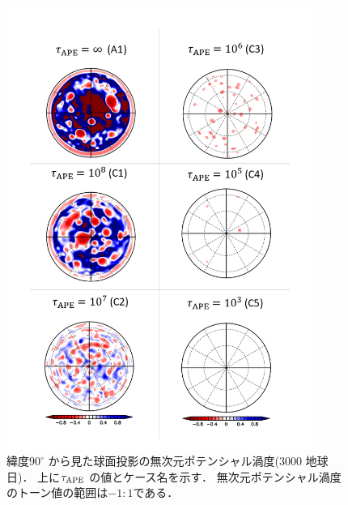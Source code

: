 \documentclass[a4j,12pt,openbib,oneside]{jreport}
\begin{document}
\begin{figure}[ht]
  \begin{center}
    \includegraphics[clip,width=10cm]{./fig/result/case2/case2_nonqv.png}
    \caption{
      \footnotesize{緯度$90^\circ$ から見た球面投影の無次元ポテンシャル渦度(3000 地球日)．
上に$\tau_{\rm{APE}}$ の値とケース名を示す．
無次元ポテンシャル渦度のトーン値の範囲は$-1:1$である．
      }
    }
    \label{fig:case2_nonqv}
  \end{center}
\end{figure}
%
%
\end{document}
